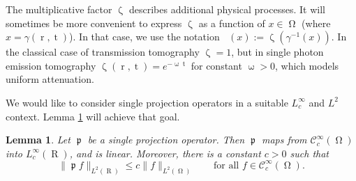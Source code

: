 \documentclass[12pt]{article}
\newtheorem{lemma}[theorem]{Lemma}
\DeclareMathOperator{\Projind}{\mathfrak{p}}
\DeclareMathOperator{\tvariable}{t}
\DeclareMathOperator{\rayvariable}{r}
\DeclareMathOperator{\raygroundset}{R}
\DeclareMathOperator{\attenuation}{\omega}
\DeclareMathOperator{\weightfkt}{\zeta}
\DeclareMathOperator{\altweightfkt}{\tilde {\zeta}}
\DeclareMathOperator{\imgdom}{{\Omega}}
\begin{document}
The multiplicative factor $\weightfkt$ describes additional physical processes. It will sometimes be more convenient to express $\weightfkt$ as a function of $x\in \imgdom$ (where $x=\gamma(\rayvariable,\tvariable)$). In that case, we use the notation $\altweightfkt(x):=\weightfkt(\gamma^{-1}(x))$. 
 In the classical case of transmission tomography $\weightfkt=1$, but in single photon emission tomography $\weightfkt(\rayvariable,\tvariable)=e^{-\attenuation\tvariable}$ for constant $\attenuation>0$,  which models uniform attenuation. 
 




We would like to consider single projection operators in a suitable $L^\infty_c$ and $L^2$ context. Lemma \ref{lemma_basic_continuity} will achieve that goal.

\begin{lemma}
\label{lemma_basic_continuity}
Let $\Projind$ be a single projection operator. Then  $\Projind$ maps from $\mathcal{C}^\infty_c(\imgdom)$ into $L^\infty_c(\raygroundset)$, and is  linear. Moreover, there is a constant $c>0$ such that
\begin{equation}\label{equ_basic_continuity}
\|\Projind f\|_{L^{2}(\raygroundset)} \leq c \|f\|_{L^{2}(\imgdom)} \qquad \text{for all $f \in \mathcal{C}^\infty_c(\imgdom)$}.
\end{equation}
\end{lemma}
\end{document}
